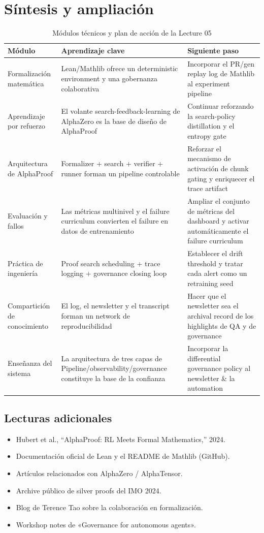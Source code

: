 \section{Síntesis y ampliación}
\begin{table}[H]
\centering
\begin{tabular}{p{4cm}p{6cm}p{5cm}}
\toprule
Módulo & Aprendizaje clave & Siguiente paso \\
\midrule
Formalización matemática & Lean/Mathlib ofrece un deterministic environment y una gobernanza colaborativa & Incorporar el PR/gen replay log de Mathlib al experiment pipeline \\
Aprendizaje por refuerzo & El volante search-feedback-learning de AlphaZero es la base de diseño de AlphaProof & Continuar reforzando la search-policy distillation y el entropy gate \\
Arquitectura de AlphaProof & Formalizer + search + verifier + runner forman un pipeline controlable & Reforzar el mecanismo de activación de chunk gating y enriquecer el trace artifact \\
Evaluación y fallos & Las métricas multinivel y el failure curriculum convierten el failure en datos de entrenamiento & Ampliar el conjunto de métricas del dashboard y activar automáticamente el failure curriculum \\
Práctica de ingeniería & Proof search scheduling + trace logging + governance closing loop & Establecer el drift threshold y tratar cada alert como un retraining seed \\
Compartición de conocimiento & El log, el newsletter y el transcript forman un network de reproducibilidad & Hacer que el newsletter sea el archival record de los highlights de QA y de governance \\
Enseñanza del sistema & La arquitectura de tres capas de Pipeline/observability/governance constituye la base de la confianza & Incorporar la differential governance policy al newsletter \& la automation \\
\bottomrule
\end{tabular}
\caption{Módulos técnicos y plan de acción de la Lecture 05}
\end{table}

\subsection{Lecturas adicionales}
\begin{itemize}
    \item Hubert et al., ``AlphaProof: RL Meets Formal Mathematics,'' 2024.
    \item Documentación oficial de Lean y el README de Mathlib (GitHub).
    \item Artículos relacionados con AlphaZero / AlphaTensor.
    \item Archive público de silver proofs del IMO 2024.
    \item Blog de Terence Tao sobre la colaboración en formalización.
    \item Workshop notes de «Governance for autonomous agents».
\end{itemize}

